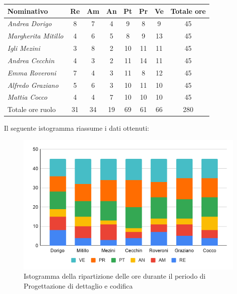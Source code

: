 {{{{{{{	\begin{center}
		\renewcommand{\arraystretch}{1.4}
		\begin{tabularx}{\textwidth}{|X|c|c|c|c|c|c|c|}
			\hline
			\rowcolor{airforceblue}
			\textbf{Nominativo} & \textbf{Re} & \textbf{Am} & \textbf{An} & \textbf{Pt} & \textbf{Pr} & \textbf{Ve} & \textbf{Totale ore}\\
			\hline
			\textit{Andrea Dorigo} & 8 & 7 & 4 & 9 & 8 & 9 & 45\\
			\hline
			\textit{Margherita Mitillo} & 4 & 6 & 5 & 8 & 9 & 13 & 45\\
			\hline
			\textit{Igli Mezini} & 3 & 8 & 2 & 10 & 11 & 11 & 45\\
			\hline
			\textit{Andrea Cecchin} & 4 & 3 & 2 & 11 & 14 & 11 & 45\\
			\hline
			\textit{Emma Roveroni} & 7 & 4 & 3 & 11 & 8 & 12 & 45\\
			\hline
			\textit{Alfredo Graziano} & 5 & 6 & 3 & 10 & 11 & 10 & 45\\
			\hline
			\textit{Mattia Cocco} & 4 & 4 & 7 & 10 & 10 & 10 & 45\\
			\hline
			Totale ore ruolo & 31 & 34 & 19 & 69 & 61 & 66 & 280\\
			\hline
		\end{tabularx}
	\end{center}

Il seguente istogramma riassume i dati ottenuti:
\begin{figure}[!ht]
	\begin{center}
		\includegraphics[width=0.8\linewidth]{../immagini/pdp/istogramma_progettazione_dettaglio.png}
		\caption{Istogramma della ripartizione delle ore durante il periodo di Progettazione di
			dettaglio e codifica}
	\end{center}
\end{figure}

}}}}}}}
